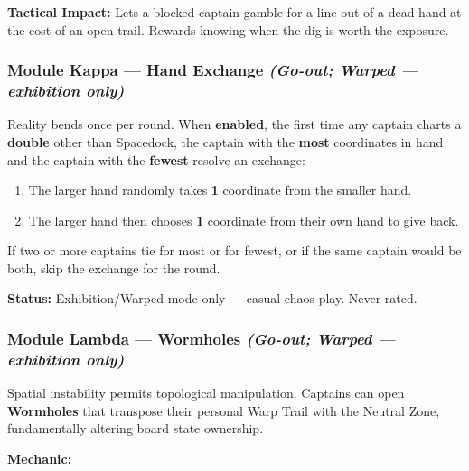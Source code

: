 \documentclass[11pt]{article}
\providecommand{\tightlist}{%
  \setlength{\itemsep}{0pt}\setlength{\parskip}{0pt}}
\begin{document}
\textbf{Tactical Impact:} Lets a blocked captain gamble for a line out of
a dead hand at the cost of an open trail. Rewards knowing when the dig is
worth the exposure.

\subsubsection{Module Kappa --- Hand Exchange
\emph{(Go-out; Warped --- exhibition
only)}}\label{module-kappa--hand-exchange-go-out}

Reality bends once per round. When \textbf{enabled}, the first time any
captain charts a \textbf{double} other than Spacedock, the captain with
the \textbf{most} coordinates in hand and the captain with the
\textbf{fewest} resolve an exchange:

\begin{enumerate}
\def\labelenumi{\arabic{enumi}.}
\tightlist
\item
  The larger hand randomly takes \textbf{1} coordinate from the smaller
  hand.
\item
  The larger hand then chooses \textbf{1} coordinate from their own hand
  to give back.
\end{enumerate}

If two or more captains tie for most or for fewest, or if the same
captain would be both, skip the exchange for the round.

\textbf{Status:} Exhibition/Warped mode only --- casual chaos play. Never
rated.

\subsubsection{Module Lambda --- Wormholes
\emph{(Go-out; Warped --- exhibition
only)}}\label{module-lambda-wormholes-go-out}

Spatial instability permits topological manipulation. Captains can open
\textbf{Wormholes} that transpose their personal Warp Trail with the
Neutral Zone, fundamentally altering board state ownership.

\textbf{Mechanic:}
\end{document}
